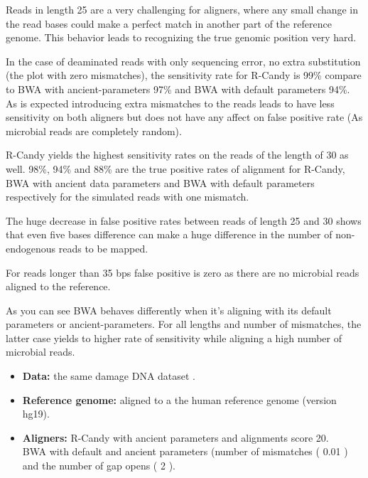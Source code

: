 \documentclass[11pt,a4paper]{report}
\begin{document}
Reads in length 25 are a very challenging for aligners, where any small change 
in the read bases could make a perfect match in another part of the reference 
genome. This behavior leads to recognizing the true genomic position very hard. 

In the case of deaminated reads with only sequencing error, no extra substitution 
(the plot with zero mismatches), the sensitivity rate for R-Candy is 99\% compare 
to BWA with ancient-parameters 97\% and BWA with default parameters 94\%. 
As is expected introducing extra mismatches to the reads leads to have less 
sensitivity on both aligners but does not have any affect on false positive rate
(As microbial reads are completely random).

R-Candy yields the highest sensitivity rates on the reads of the length of 30 as well. 
98\%, 94\% and 88\% are the true positive rates of alignment for R-Candy, 
BWA with ancient data parameters and BWA with default parameters respectively 
for the simulated reads with one mismatch. 

The huge decrease in false positive rates between reads of length 25 and 30 
shows that even five bases difference can make a huge difference in the number of 
non-endogenous reads to be mapped.

For reads longer than 35 bps false positive is zero as there are no microbial 
reads aligned to the reference.

As you can see BWA behaves differently when it's aligning with its default 
parameters or ancient-parameters. For all lengths and number of mismatches, the 
latter case yields to higher rate of sensitivity while aligning a high number of 
microbial reads.


 
 \begin{itemize}
   \item \textbf{Data:} the same damage DNA dataset .
   
   \item \textbf{Reference genome:} aligned to a the human reference genome (version hg19).

    \item \textbf{Aligners:} R-Candy with ancient parameters and 
    alignments score 20. \\
BWA with default and ancient parameters 
(number of mismatches ( 0.01 ) and the number of gap opens ( 2 ).
  
  \end{itemize}
 
\end{document}
